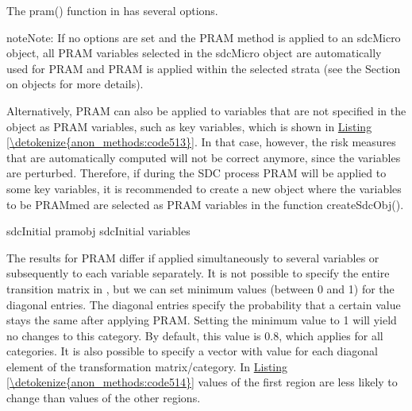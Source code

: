 \documentclass[letterpaper,10pt,english]{sphinxmanual}
\begin{document}
The pram() function in  has several options.

\begin{sphinxadmonition}{note}{Note:}
If no options are set and the PRAM method is applied to an sdcMicro object,
all PRAM variables selected in the sdcMicro object are automatically
used for PRAM and PRAM is applied within the selected strata (see
the Section 
on  objects for more details).
\end{sphinxadmonition}

Alternatively, PRAM
can also be applied to variables that are not specified in the
 object as PRAM variables, such as key variables, which is
shown in \hyperref[\detokenize{anon_methods:code513}]{Listing \ref{\detokenize{anon_methods:code513}}}. In that case, however, the risk measures that are
automatically computed will not be correct anymore, since the variables
are perturbed. Therefore, if during the SDC process PRAM will be applied
to some key variables, it is recommended to create a new 
object where the variables to be PRAMmed are selected as PRAM variables
in the function createSdcObj().

\def\sphinxLiteralBlockLabel{\label{\detokenize{anon_methods:code513}}}
%
\begin{sphinxVerbatim}[commandchars=\\\{\},numbers=left,firstnumber=1,stepnumber=1]

sdcInitial  pramobj  sdcInitial variables   
\end{sphinxVerbatim}

The results for PRAM differ if applied simultaneously to several
variables or subsequently to each variable separately. It is not
possible to specify the entire transition matrix in , but we
can set minimum values (between 0 and 1) for the diagonal entries. The
diagonal entries specify the probability that a certain value stays the
same after applying PRAM. Setting the minimum value to 1 will yield no
changes to this category. By default, this value is 0.8, which applies
for all categories. It is also possible to specify a vector with value
for each diagonal element of the transformation matrix/category. In
\hyperref[\detokenize{anon_methods:code514}]{Listing \ref{\detokenize{anon_methods:code514}}} values of the first region are less likely to change than
values of the other regions.
\end{document}
